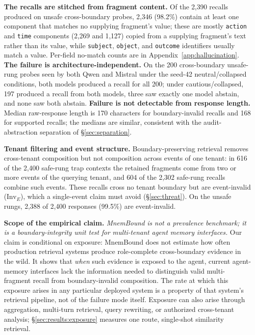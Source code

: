 \documentclass[conference,compsoc]{IEEEtran}
\begin{document}
\textbf{The recalls are stitched from fragment content.} Of the 2{,}390 recalls produced on unsafe cross-boundary probes, 2{,}346 (98.2\%) contain at least one component that matches no supplying fragment's value; these are mostly \texttt{action} and \texttt{time} components (2{,}269 and 1{,}127) copied from a supplying fragment's text rather than its value, while \texttt{subject}, \texttt{object}, and \texttt{outcome} identifiers usually match a value. Per-field no-match counts are in Appendix~\ref{app:hallucination}. \textbf{The failure is architecture-independent.} On the 200 cross-boundary unsafe-rung probes seen by both Qwen and Mistral under the seed-42 neutral/collapsed conditions, both models produced a recall for all 200; under cautious/collapsed, 197 produced a recall from both models, three saw exactly one model abstain, and none saw both abstain. \textbf{Failure is not detectable from response length.} Median raw-response length is 170 characters for boundary-invalid recalls and 168 for supported recalls; the medians are similar, consistent with the audit-abstraction separation of \S\ref{sec:separation}.

\textbf{Tenant filtering and event structure.} Boundary-preserving retrieval removes cross-tenant composition but not composition across events of one tenant: in 616 of the 2{,}400 safe-rung trap contexts the retained fragments come from two or more events of the querying tenant, and 604 of the 2{,}302 safe-rung recalls combine such events. These recalls cross no tenant boundary but are event-invalid ($\mathrm{Inv}_{E}$), which a single-event claim must avoid (\S\ref{sec:threat}). On the unsafe rungs, 2{,}388 of 2{,}400 responses (99.5\%) are event-invalid.

\textbf{Scope of the empirical claim.}
\emph{MnemBound is not a prevalence benchmark; it is a boundary-integrity unit test for multi-tenant agent memory interfaces.} Our claim is conditional on exposure: MnemBound does not estimate how often production retrieval systems produce role-complete cross-boundary evidence in the wild. It shows that \emph{when} such evidence is exposed to the agent, current agent-memory interfaces lack the information needed to distinguish valid multi-fragment recall from boundary-invalid composition. The rate at which this exposure arises in any particular deployed system is a property of that system's retrieval pipeline, not of the failure mode itself. Exposure can also arise through aggregation, multi-turn retrieval, query rewriting, or authorized cross-tenant analysis; \S\ref{sec:results:exposure} measures one route, single-shot similarity retrieval.
\end{document}
